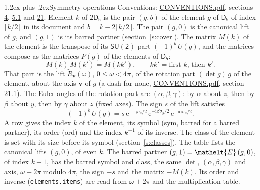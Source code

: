 \documentclass[10pt,a4paper]{article}
\makeatletter
\renewcommand\section{\@startsection{section}{1}{\z@}{-3ex plus -1ex minus -.2ex}%
  {1.2ex plus .2ex}{\normalfont\large\sffamily\bfseries\color{parttitle}}}
\numberwithin{equation}{section}
\newcommand{\eltfont}[1]{{\let\sigma\eltsigma\mathelt{#1}}}
\newcommand{\grp}[1]{\mathsf{#1}}
\newcommand{\elt}[1]{\eltfont{#1}}
\newcommand{\vv}{\mathbf{v}}
\newcommand{\iunit}{\mathrm{i}}
\newcommand{\expe}{\mathrm{e}}
\newcommand{\barred}[1]{\bar{#1}}
\newcommand{\lift}[1]{\tilde{#1}}
\newcommand{\pauli}[1]{\sigma_{#1}}
\makeatother
\begin{document}
\section{Symmetry operations}\label{s:elements}
Conventions: \href{../../CONVENTIONS.pdf}{CONVENTIONS.pdf}, sections \href{../../../rotation/CONVENTIONS.pdf\#conv.4}{4}, \href{../../../rotation/CONVENTIONS.pdf\#conv.5.1}{5.1} and \href{../../CONVENTIONS.pdf\#conv.21}{21}.
\leavevmode\label{n:index.element}\label{n:element.g}Element $k$ of $\grp{2D_{5}}$ is the pair $(g, b)$ of the element $g$ of \href{../../../rotation/data/pdf/D5.pdf}{$\grp{D_{5}}$} of index $\lfloor k/2\rfloor$ in its document and $b = k - 2\lfloor k/2\rfloor$. The pair $(g, 0)$ is the canonical lift of $g$, and $(g, 1)$ is its barred partner (section~\ref{s:cover}). \label{n:matrix.element.pin}\label{n:matrix.element}The matrix $M(k)$ of the element is the transpose of its $\grp{SU(2)}$ part $(-1)^{b}\,U(g)$, and the matrices compose as the matrices $P(g)$ of the elements of $\grp{D_{5}}$:
\begin{equation}\label{e:mprod}M(k)\,M(k') = M(kk'),\qquad kk' = \text{first } k\text{, then } k'.\end{equation}
\leavevmode\label{n:angle.omega}\label{n:vector.axis}\label{n:vector.pole}That part is the lift $\lift{R}_{\vv}(\omega)$, $0 \le \omega < 4\pi$, of the rotation part $(\det g)\,g$ of the element, about the axis $\vv$ of $g$ (a dash for none, \href{../../CONVENTIONS.pdf}{CONVENTIONS.pdf}, section \href{../../CONVENTIONS.pdf\#conv.21.1}{21.1}). \label{n:angle.euler.alpha}\label{n:angle.euler.beta}\label{n:angle.euler.gamma}\label{n:vector.coordinates}The Euler angles of the rotation part are $(\alpha,\beta,\gamma)$: by $\alpha$ about $z$, then by $\beta$ about $y$, then by $\gamma$ about $z$ (fixed axes). \label{n:local.euler.sign}The sign $s$ of the lift satisfies
\begin{equation}\label{e:euler}(-1)^{b}\,U(g) = s\,\expe^{-\iunit\gamma\pauli{z}/2}\,\expe^{-\iunit\beta\pauli{y}/2}\,\expe^{-\iunit\alpha\pauli{z}/2}.\end{equation}
\leavevmode\label{n:index.element.inverse}\label{n:head.sym}\label{n:head.ord}A row gives the index $k$ of the element, its symbol (sym, barred for a barred partner), its order (ord) and the index $k^{-1}$ of its inverse. \label{n:head.class}The class of the element is set with its size before its symbol (section~\ref{s:classes}).
The table lists the canonical lifts $(g, 0)$, of even $k$. The barred partner $(g, 1) = \elt{\barred{E}}\,(g, 0)$, of index $k + 1$, has the barred symbol and class, the same $\det$, $(\alpha,\beta,\gamma)$ and axis, $\omega + 2\pi$ modulo $4\pi$, the sign $-s$ and the matrix $-M(k)$. Its order and inverse (\texttt{elements.items}) are read from $\omega + 2\pi$ and the multiplication table.
\end{document}
